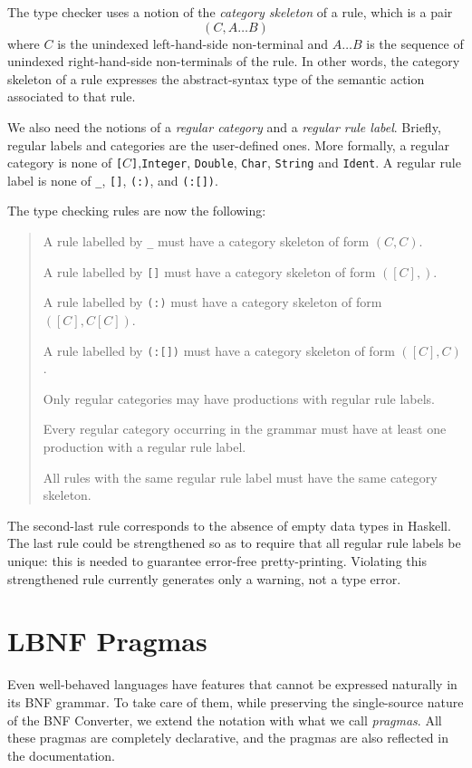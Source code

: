 \documentclass[10pt]{article}
\newcommand{\bequ}{\begin{quote}}
\newcommand{\enqu}{\end{quote}}
\begin{document}
The type checker uses a notion of the
\textit{category skeleton} of a rule, which is a pair
\[
  (C, A\ldots B)
\]
where $C$ is the unindexed left-hand-side non-terminal and $A\ldots B$
is the sequence of unindexed right-hand-side non-terminals of the rule.
In other words, the category skeleton of a rule expresses the abstract-syntax
type of the semantic action associated to that rule.

We also need the notions of
a \textit{regular category} and
a \textit{regular rule label}.
Briefly, regular labels and categories are the user-defined ones.
More formally,
a regular category is none of
{\tt[}$C${\tt]},{\tt Integer}, {\tt Double}, {\tt Char}, {\tt String}
and {\tt Ident}.
A regular rule label is none of
{\tt \_}, {\tt []}, {\tt (:)}, and {\tt (:[])}.

The type checking rules are now the following:
\bequ
A rule labelled by {\tt \_} must have a category skeleton of form $(C,C)$.

A rule labelled by {\tt []} must have a category skeleton of form $([C],)$.

A rule labelled by {\tt (:)} must have a category skeleton of form $([C],C[C])$.

A rule labelled by {\tt (:[])} must have a category skeleton of form $([C],C)$.

Only regular categories may have productions with regular rule labels.

Every regular category occurring in the grammar
must have at least one production with a regular rule label.

All rules with the same regular rule label must have the same
category skeleton.
\enqu
The second-last rule corresponds to the absence of empty data types in Haskell.
The last rule could
be strengthened so as to require that all regular rule labels be unique:
this is needed to guarantee error-free pretty-printing.
Violating this strengthened rule currently
generates only a warning, not a type error.



\section{LBNF Pragmas}

Even well-behaved languages have features that
cannot be expressed naturally in its BNF grammar.
To take care of them, while preserving the single-source nature of
the BNF Converter, we extend the notation with what we call \textit{pragmas}.
All these pragmas are completely declarative, and the pragmas are also
reflected in the documentation.
\end{document}
